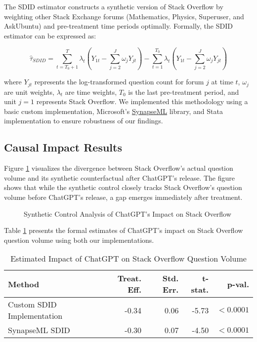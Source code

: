 The SDID estimator constructs a synthetic version of Stack Overflow by weighting other Stack Exchange forums (Mathematics, Physics, Superuser, and AskUbuntu) and pre-treatment time periods optimally. Formally, the SDID estimator can be expressed as:

\begin{equation}
    \hat{\tau}_{SDID} = \sum_{t=T_0+1}^T \lambda_t \left( Y_{1t} - \sum_{j=2}^J \omega_j Y_{jt} \right) - \sum_{t=1}^{T_0} \lambda_t \left( Y_{1t} - \sum_{j=2}^J \omega_j Y_{jt} \right)
\end{equation}

where $Y_{jt}$ represents the log-transformed question count for forum $j$ at time $t$, $\omega_j$ are unit weights, $\lambda_t$ are time weights, $T_0$ is the last pre-treatment period, and unit $j=1$ represents Stack Overflow. We implemented this methodology using a basic custom implementation, Microsoft's \href{https://microsoft.github.io/SynapseML/docs/Overview/}{SynapseML} library, and \textcite{clarke_synthetic_2023} Stata implementation to ensure robustness of our findings.

\subsection{Causal Impact Results}

Figure \ref{fig:synthetic_control} visualizes the divergence between Stack Overflow's actual question volume and its synthetic counterfactual after ChatGPT's release. The figure shows that while the synthetic control closely tracks Stack Overflow's question volume before ChatGPT's release, a gap emerges immediately after treatment.\\

\begin{figure}[htpb!]
    \centering
    
    \caption{Synthetic Control Analysis of ChatGPT's Impact on Stack Overflow}
    \label{fig:synthetic_control}
\end{figure}

Table \ref{tab:results} presents the formal estimates of ChatGPT's impact on Stack Overflow question volume using both our implementations.\\

\begin{table}[htpb!]
\centering
    \begin{tabular}{lrrrr}
        \toprule
        \textbf{Method} & \textbf{Treat. Eff.} & \textbf{Std. Err.} & \textbf{t-stat.} & \textbf{p-val.} \\
        \midrule
        Custom SDID Implementation & -0.34 & 0.06 & -5.73 & $<0.0001$ \\
        SynapseML SDID & -0.30 & 0.07 & -4.50 & $<0.0001$ \\
        \bottomrule
    \end{tabular}
    \caption{Estimated Impact of ChatGPT on Stack Overflow Question Volume}
    \label{tab:results}
\end{table}

